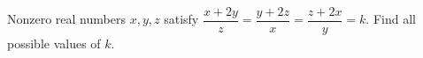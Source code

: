 Nonzero real numbers $x,y,z$ satisfy $\dfrac{x+2y}z=\dfrac{y+2z}x=\dfrac{z+2x}y=k$. Find all possible values of $k$.
